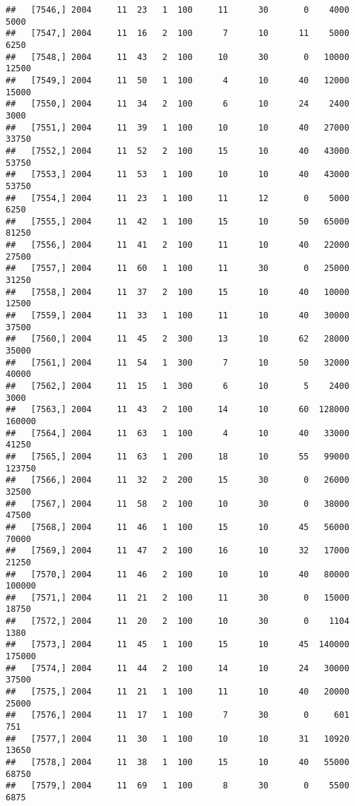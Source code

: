 \documentclass{article}\usepackage[]{graphicx}\usepackage[]{color}
\makeatletter
\newenvironment{kframe}{%
 \def\at@end@of@kframe{}%
 \ifinner\ifhmode%
  \def\at@end@of@kframe{\end{minipage}}%
  \begin{minipage}{\columnwidth}%
 \fi\fi%
 \def\FrameCommand##1{\hskip\@totalleftmargin \hskip-\fboxsep
 \colorbox{shadecolor}{##1}\hskip-\fboxsep
     \hskip-\linewidth \hskip-\@totalleftmargin \hskip\columnwidth}%
 \MakeFramed {\advance\hsize-\width
   \@totalleftmargin\z@ \linewidth\hsize
   \@setminipage}}%
 {\par\unskip\endMakeFramed%
 \at@end@of@kframe}
\newenvironment{knitrout}{}{} %
\makeatother
\begin{document}
\begin{knitrout}
\begin{kframe}
\begin{verbatim}
##   [7546,] 2004     11  23   1  100     11      30       0    4000    5000
##   [7547,] 2004     11  16   2  100      7      10      11    5000    6250
##   [7548,] 2004     11  43   2  100     10      30       0   10000   12500
##   [7549,] 2004     11  50   1  100      4      10      40   12000   15000
##   [7550,] 2004     11  34   2  100      6      10      24    2400    3000
##   [7551,] 2004     11  39   1  100     10      10      40   27000   33750
##   [7552,] 2004     11  52   2  100     15      10      40   43000   53750
##   [7553,] 2004     11  53   1  100     10      10      40   43000   53750
##   [7554,] 2004     11  23   1  100     11      12       0    5000    6250
##   [7555,] 2004     11  42   1  100     15      10      50   65000   81250
##   [7556,] 2004     11  41   2  100     11      10      40   22000   27500
##   [7557,] 2004     11  60   1  100     11      30       0   25000   31250
##   [7558,] 2004     11  37   2  100     15      10      40   10000   12500
##   [7559,] 2004     11  33   1  100     11      10      40   30000   37500
##   [7560,] 2004     11  45   2  300     13      10      62   28000   35000
##   [7561,] 2004     11  54   1  300      7      10      50   32000   40000
##   [7562,] 2004     11  15   1  300      6      10       5    2400    3000
##   [7563,] 2004     11  43   2  100     14      10      60  128000  160000
##   [7564,] 2004     11  63   1  100      4      10      40   33000   41250
##   [7565,] 2004     11  63   1  200     18      10      55   99000  123750
##   [7566,] 2004     11  32   2  200     15      30       0   26000   32500
##   [7567,] 2004     11  58   2  100     10      30       0   38000   47500
##   [7568,] 2004     11  46   1  100     15      10      45   56000   70000
##   [7569,] 2004     11  47   2  100     16      10      32   17000   21250
##   [7570,] 2004     11  46   2  100     10      10      40   80000  100000
##   [7571,] 2004     11  21   2  100     11      30       0   15000   18750
##   [7572,] 2004     11  20   2  100     10      30       0    1104    1380
##   [7573,] 2004     11  45   1  100     15      10      45  140000  175000
##   [7574,] 2004     11  44   2  100     14      10      24   30000   37500
##   [7575,] 2004     11  21   1  100     11      10      40   20000   25000
##   [7576,] 2004     11  17   1  100      7      30       0     601     751
##   [7577,] 2004     11  30   1  100     10      10      31   10920   13650
##   [7578,] 2004     11  38   1  100     15      10      40   55000   68750
##   [7579,] 2004     11  69   1  100      8      30       0    5500    6875

\end{verbatim}
\end{kframe}
\end{knitrout}
\end{document}
